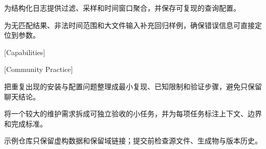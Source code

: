 \begin{resumelist}
  \item 为结构化日志提供过滤、采样和时间窗口聚合，并保存可复现的查询配置。
  \item 为无匹配结果、非法时间范围和大文件输入补充回归样例，确保错误信息可直接定位到参数。
\end{resumelist}

[Capabilities]

\begin{resumegrid}[3]
\end{resumegrid}

[Community Practice]

\begin{resumelist}
  \item {}把重复出现的安装与配置问题整理成最小复现、已知限制和验证步骤，避免只保留聊天结论。
  \item {}将一个较大的维护需求拆成可独立验收的小任务，并为每项任务标注上下文、边界和完成标准。
  \item {}示例仓库只保留虚构数据和保留域链接；提交前检查源文件、生成物与版本历史。
\end{resumelist}
